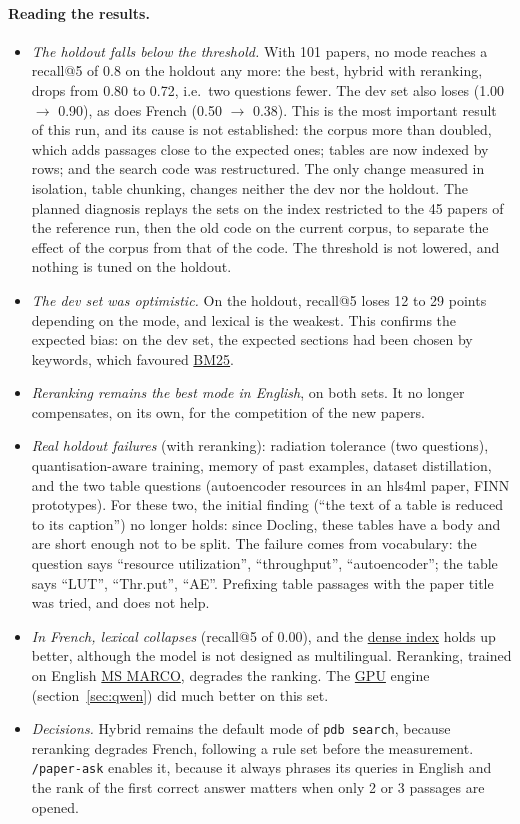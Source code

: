 \documentclass[11pt,a4paper]{article}
\newcommand{\cmd}[1]{\texttt{#1}}
\newcommand{\gl}[2]{\hyperlink{gl:#1}{\textcolor{glcolor}{#2}}}
\begin{document}
\paragraph{Reading the results.}
\begin{itemize}
  \item \emph{The holdout falls below the threshold.} With 101 papers, no mode reaches a
    recall@5 of 0.8 on the holdout any more: the best, hybrid with reranking, drops from 0.80
    to 0.72, i.e.\ two questions fewer. The dev set also loses (1.00 $\rightarrow$ 0.90), as
    does French (0.50 $\rightarrow$ 0.38). This is the most important result of this run,
    and its cause is not established: the corpus more than doubled, which adds passages close
    to the expected ones; tables are now indexed by rows; and the search code was
    restructured. The only change measured in isolation, table chunking, changes neither the
    dev nor the holdout. The planned diagnosis replays the sets on the index restricted to
    the 45 papers of the reference run, then the old code on the current corpus, to separate
    the effect of the corpus from that of the code. The threshold is not lowered, and nothing
    is tuned on the holdout.
  \item \emph{The dev set was optimistic.} On the holdout, recall@5 loses 12 to 29 points
    depending on the mode, and lexical is the weakest. This confirms the expected bias: on
    the dev set, the expected sections had been chosen by keywords, which favoured \gl{BM25}{BM25}.
  \item \emph{Reranking remains the best mode in English}, on both sets. It no longer
    compensates, on its own, for the competition of the new papers.
  \item \emph{Real holdout failures} (with reranking): radiation tolerance (two questions),
    quantisation-aware training, memory of past examples, dataset distillation, and the two
    table questions (autoencoder resources in an hls4ml paper, FINN prototypes). For these two,
    the initial finding (``the text of a table is reduced to its caption'') no longer holds:
    since Docling, these tables have a body and are short enough not to be split. The failure
    comes from vocabulary: the question says ``resource utilization'', ``throughput'',
    ``autoencoder''; the table says ``LUT'', ``Thr.put'', ``AE''. Prefixing table passages with
    the paper title was tried, and does not help.
  \item \emph{In French, lexical collapses} (recall@5 of 0.00), and the \gl{index}{dense index} holds up
    better, although the model is not designed as multilingual. Reranking, trained on
    English \gl{MSMARCO}{MS MARCO}, degrades the ranking. The \gl{GPU}{GPU} engine (section~\ref{sec:qwen}) did much
    better on this set.
  \item \emph{Decisions.} Hybrid remains the default mode of \cmd{pdb search}, because
    reranking degrades French, following a rule set before the measurement. \cmd{/paper-ask}
    enables it, because it always phrases its queries in English and the rank of the first
    correct answer matters when only 2 or 3 passages are opened.
\end{itemize}
\end{document}
